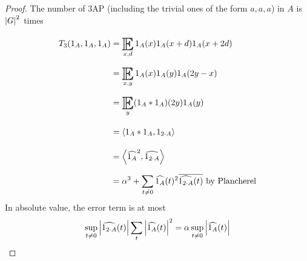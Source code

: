\documentclass{article}
\begin{document}
\begin{proof}
  The number of 3AP (including the trivial ones of the form $a, a, a$) in $A$ is $\left\lvert G\right\rvert^2$ times
  \begin{align*}
    T_3(1_A, 1_A, 1_A)
    & = \E_{x, d} 1_A(x) 1_A(x + d) 1_A(x + 2d) \\
    & = \E_{x, y} 1_A(x) 1_A(y) 1_A(2y - x) \\
    & = \E_y (1_A \ast 1_A)(2y) 1_A(y) \\
    & = \inn{1_A \ast 1_A}{1_{2 \cdot A}} \\
    & = \inn{\widehat{1_A}^2}{\widehat{1_{2 \cdot A}}} \\
    & = \alpha^3 + \sum_{t \ne 0} \widehat{1_A}(t)^2 \overline{\widehat{1_{2 \cdot A}}(t)} \text{ by Plancherel}
  \end{align*}
  In absolute value, the error term is at most
  $$\sup_{t \ne 0} \left\lvert \widehat{1_{2 \cdot A}}(t)\right\rvert \sum_t \left\lvert \widehat{1_A}(t)\right\rvert^2 = \alpha \sup_{t \ne 0} \left\lvert \widehat{1_A}(t)\right\rvert$$
\end{proof}
\end{document}
